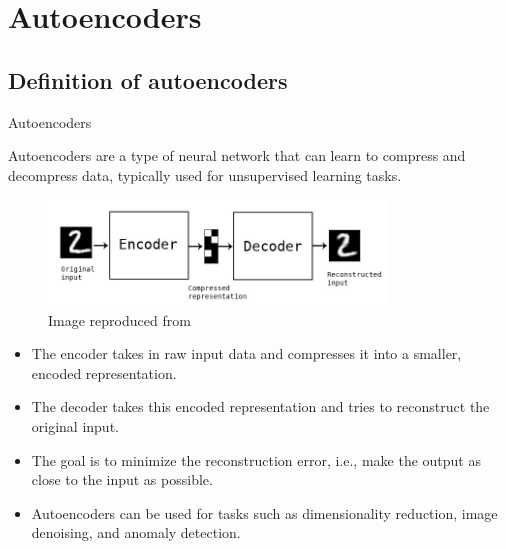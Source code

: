 \renewcommand{\prevpart}{7 }
\renewcommand{\thispart}{8 }
\renewcommand{\nextpart}{9 }

\section{Autoencoders}





%
%
%
\subsection{Definition of autoencoders}

\begin{frame}{Autoencoders}

    Autoencoders are a type of neural network that can learn to compress 
    and decompress data, typically used for unsupervised learning tasks.
    
    \begin{figure}[h]
    \centering
    \includegraphics[width=0.8\textwidth]{./images/autoencoders/autoencoder_schema.png}\\
    {\scriptsize 
    \color{col:attribution} 
    Image reproduced from \cite{KerasBlog:BuildingAutoencodersInKeras}}\\
    \end{figure}
    
    \begin{itemize}
    \item The encoder takes in raw input data and compresses it into a smaller, encoded representation.
    \item The decoder takes this encoded representation and tries to reconstruct the original input.
    \item The goal is to minimize the reconstruction error, i.e., make the output as close to the input as possible.
    \item Autoencoders can be used for tasks such as dimensionality reduction, image denoising, and anomaly detection.
    \end{itemize}
    
\end{frame}

